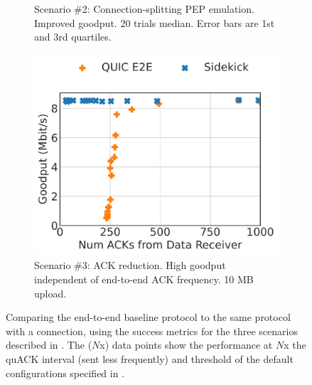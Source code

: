 \begin{figure}
\begin{subfigure}{0.31\textwidth}
\caption{Scenario \#2: Connection-splitting PEP emulation. Improved goodput.
20 trials median. Error bars are 1st and 3rd quartiles.
}
\label{fig:baseline-line}
\end{subfigure}
\hfill
\begin{subfigure}{0.32\textwidth}
\includegraphics[width=0.99\linewidth]{figures/fig4c_ack_reduction.pdf}
\caption{Scenario \#3: ACK reduction.
High goodput independent of end-to-end ACK frequency.
10 MB upload.}
\label{fig:ack-reduction}
\end{subfigure}
\caption{
Comparing the end-to-end baseline protocol to the same protocol with a \sys
connection, using the success metrics for the three scenarios described in
. The \textsf{\Sys($N$x)} data points show
the performance at $N$x the quACK interval (sent less frequently) and
threshold of the default configurations specified in
.
\vspace{-0.3cm}
}
\label{fig:main-results}
\end{figure}
